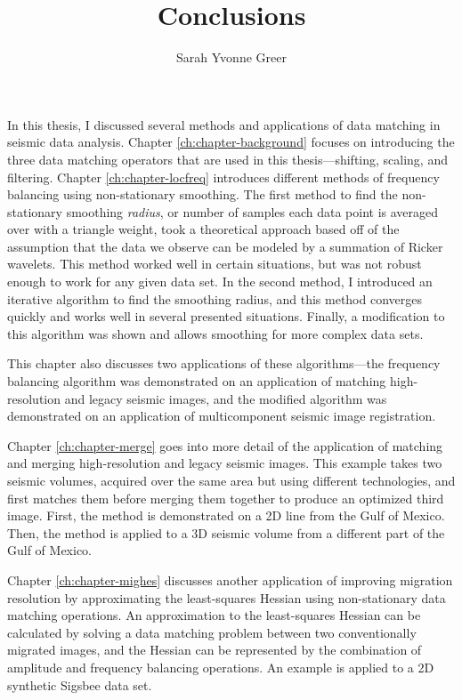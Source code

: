 \title{Conclusions}
\author{Sarah Yvonne Greer}
\label{ch:chapter-conclusion}

\maketitle


In this thesis, I discussed several methods and applications of data matching in seismic data analysis.
Chapter \ref{ch:chapter-background} focuses on introducing the three data matching operators that are used in this thesis---shifting, scaling, and filtering.
Chapter \ref{ch:chapter-locfreq} introduces different methods of frequency balancing using non-stationary smoothing. 
The first method to find the non-stationary smoothing {\em radius}, or number of samples each data point is averaged over with a triangle weight, took a theoretical approach based off of the assumption that the data we observe can be modeled by a summation of Ricker wavelets.
This method worked well in certain situations, but was not robust enough to work for any given data set.
In the second method, I introduced an iterative algorithm to find the smoothing radius, and this method converges quickly and works well in several presented situations. 
Finally, a modification to this algorithm was shown and allows smoothing for more complex data sets.

This chapter also discusses two applications of these algorithms---the frequency balancing algorithm was demonstrated on an application of matching high-resolution and legacy seismic images, and the modified algorithm was demonstrated on an application of multicomponent seismic image registration.

Chapter \ref{ch:chapter-merge} goes into more detail of the application of matching and merging high-resolution and legacy seismic images.
This example takes two seismic volumes, acquired over the same area but using different technologies, and first matches them before merging them together to produce an optimized third image.
First, the method is demonstrated on a 2D line from the Gulf of Mexico.
Then, the method is applied to a 3D seismic volume from a different part of the Gulf of Mexico.

Chapter \ref{ch:chapter-mighes} discusses another application of improving migration resolution by approximating the least-squares Hessian using non-stationary data matching operations.
An approximation to the least-squares Hessian can be calculated by solving a data matching problem between two conventionally migrated images, and the Hessian can be represented by the combination of amplitude and frequency balancing operations.
An example is applied to a 2D synthetic Sigsbee data set.

